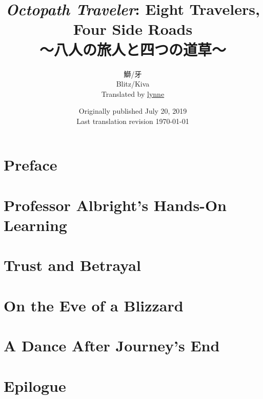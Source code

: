 \documentclass[a4paper,11pt]{memoir}
\title{%
\emph{Octopath Traveler}: Eight Travelers, Four Side Roads \\
\large{～八人の旅人と四つの道草～}
}
\author{%
鰤/牙 \\
Blitz/Kiva \\
Translated by \href{https://lynne.bearblog.dev}{lynne}
}
\date{%
Originally published July 20, 2019 \\
Last translation revision \today
}
\begin{document}
	\maketitle
	\pagebreak
	\tableofcontents*
	\frontmatter
	\chapter{Preface}
		
	\mainmatter
	\chapter{Professor Albright's Hands-On Learning}
		
	\chapter{Trust and Betrayal}
		
	\chapter{On the Eve of a Blizzard}
			
	\chapter{A Dance After Journey's End}
		
	\chapter{Epilogue}
\end{document}
